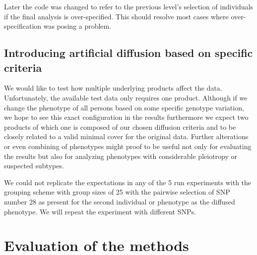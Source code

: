 \documentclass[letterpaper, 11pt]{article}
\begin{document}
Later the code was changed to refer to the previous level's selection of individuals if the final analysis is over-specified. This should resolve most cases where over-specification was posing a problem.  

\subsection{Introducing artificial diffusion based on specific criteria}

We would like to test how multiple underlying products affect the data. Unfortunately, the available test data only requires one product. Although if we change the phenotype of all persons based on some specific genotype variation, we hope to see this exact configuration in the results furthermore we expect two products of which one is composed of our chosen diffusion criteria and to be closely related to a valid minimal cover for the original data. Further alterations or even combining of phenotypes might proof to be useful not only for evaluating the results but also for analyzing phenotypes with considerable pleiotropy or suspected subtypes.

We could not replicate the expectations in any of the 5 run experiments with the grouping scheme with group sizes of 25 with the pairwise selection of SNP number 28 as present for the second individual or phenotype as the diffused phenotype. We will repeat the experiment with different SNPs. 

\section{Evaluation of the methods}
\begin{figure} [h] 
\end{figure}
\end{document}
